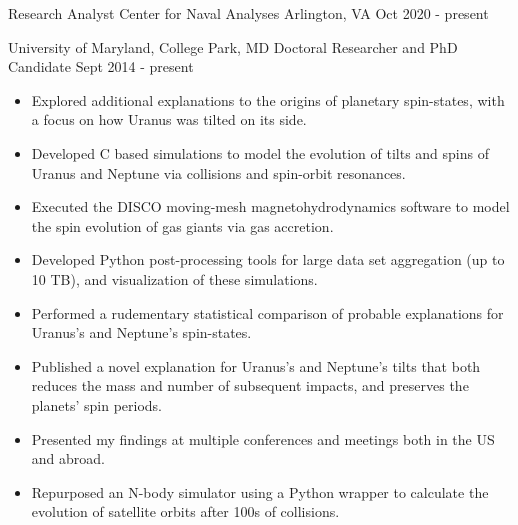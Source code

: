 \documentclass[]{awesome-cv}
\begin{document}
\vspace{-9mm}

\begin{cventries}
	\cventry
	{Research Analyst}
	{Center for Naval Analyses}
	{Arlington, VA}
	{Oct 2020 - present}
	{}
\end{cventries}

\vspace{-5mm}

\begin{cventries}
		\cventry
		{University of Maryland, College Park, MD}
		{Doctoral Researcher and PhD Candidate}
		{Sept 2014 - present}
		{}
		{\vspace{-3mm}
			\begin{itemize}
				\item Explored additional explanations to the origins of planetary spin-states, with a focus on how Uranus was tilted on its side. \vspace{0.7mm}
				\item Developed C based simulations to model the evolution of tilts and spins of Uranus and Neptune via collisions and spin-orbit resonances. \vspace{0.7mm}
				\item Executed the DISCO moving-mesh magnetohydrodynamics software to model the spin evolution of gas giants via gas accretion. \vspace{0.7mm} 
				\item Developed Python post-processing tools for large data set aggregation (up to 10 TB), and visualization of these simulations. \vspace{0.7mm}
				\item Performed a rudementary statistical comparison of probable explanations for Uranus's and Neptune's spin-states. \vspace{0.7mm}
				\item Published a novel explanation for Uranus's and Neptune's tilts that both reduces the mass and number of subsequent impacts, and preserves the planets' spin periods. \vspace{0.7mm}
				\item Presented my findings at multiple conferences and meetings both in the US and abroad. \vspace{0.7mm}
				\item Repurposed an N-body simulator using a Python wrapper to calculate the evolution of satellite orbits after 100s of collisions. \vspace{0.7mm}
			\end{itemize}
		}
	

\end{cventries}
\end{document}
